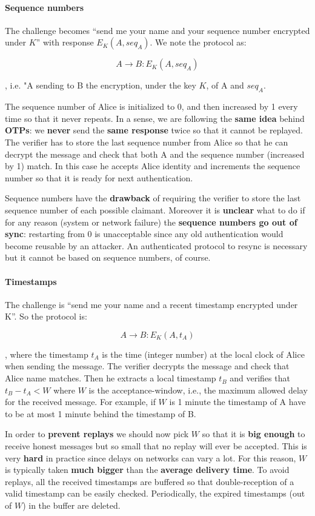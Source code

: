 \paragraph{Sequence numbers}
The challenge becomes “send me your name and your sequence number encrypted under $K$” with response $E_K(A, seq_A)$. We note the protocol as:

$$A \rightarrow B: E_K(A, seq_A)$$

, i.e. "A sending to B the encryption, under the key $K$, of A and $seq_A$.

The sequence number of Alice is initialized to 0, and then increased by 1 every time so that it never repeats. In a sense, we are following the \textbf{same idea} behind \textbf{OTPs}: we \textbf{never} send the \textbf{same response} twice so that it cannot be replayed. The verifier has to store the last sequence number from Alice so that he can decrypt the message and check that both A and the sequence number (increased by 1) match. In this case he accepts Alice identity and increments the sequence number so that it is ready for next authentication.

Sequence numbers have the \textbf{drawback} of requiring the verifier to store the last sequence number of each possible claimant. Moreover it is \textbf{unclear} what to do if for any reason (system or network failure) the \textbf{sequence numbers go out of sync}: restarting from 0 is unacceptable since any old authentication would become reusable by an attacker. An authenticated protocol to resync is necessary but it cannot be based on sequence numbers, of course.

\paragraph{Timestamps}
The challenge is “send me your name and a recent timestamp encrypted under K”. So the protocol is:

$$A \rightarrow B: E_K(A, t_A) $$

, where the timestamp $t_A$ is the time (integer number) at the local clock of Alice when sending the message. The verifier decrypts the message and check that Alice name matches. Then he extracts a local timestamp $t_B$ and verifies that $t_B-t_A < W$ where $W$ is the acceptance-window, i.e., the maximum allowed delay for the received message. For example, if $W$ is 1 minute the timestamp of A have to be at most 1 minute behind the timestamp of B.

In order to \textbf{prevent replays} we should now pick $W$ so that it is \textbf{big enough} to receive honest messages but so small that no replay will ever be accepted. This is very \textbf{hard} in practice since delays on networks can vary a lot. For this reason, $W$ is typically taken \textbf{much bigger} than the \textbf{average delivery time}. To avoid replays, all the received timestamps are buffered so that double-reception of a valid timestamp can be easily checked. Periodically, the expired timestamps (out of $W$) in the buffer are deleted.

